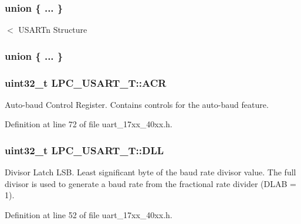 \subsubsection[{\texorpdfstring{"@6}{@6}}]{\setlength{\rightskip}{0pt plus 5cm}union \{ ... \} }\hypertarget{structLPC__USART__T_add0ae85b6ee1d205dde773d1e1881af6}{}\label{structLPC__USART__T_add0ae85b6ee1d205dde773d1e1881af6}
$<$ U\+S\+A\+R\+Tn Structure \subsubsection[{\texorpdfstring{"@8}{@8}}]{\setlength{\rightskip}{0pt plus 5cm}union \{ ... \} }\hypertarget{structLPC__USART__T_acc78b55e1184fbc55889f95cd70d8105}{}\label{structLPC__USART__T_acc78b55e1184fbc55889f95cd70d8105}
\subsubsection[{\texorpdfstring{A\+CR}{ACR}}]{ uint32\+\_\+t L\+P\+C\+\_\+\+U\+S\+A\+R\+T\+\_\+\+T\+::\+A\+CR}\hypertarget{structLPC__USART__T_a443bb067899c7f269dc903a26522f44b}{}\label{structLPC__USART__T_a443bb067899c7f269dc903a26522f44b}
Auto-\/baud Control Register. Contains controls for the auto-\/baud feature. 

Definition at line 72 of file uart\+\_\+17xx\+\_\+40xx.\+h.

\subsubsection[{\texorpdfstring{D\+LL}{DLL}}]{ uint32\+\_\+t L\+P\+C\+\_\+\+U\+S\+A\+R\+T\+\_\+\+T\+::\+D\+LL}\hypertarget{structLPC__USART__T_ac2e91646e820b1527747154d82778e48}{}\label{structLPC__USART__T_ac2e91646e820b1527747154d82778e48}
Divisor Latch L\+SB. Least significant byte of the baud rate divisor value. The full divisor is used to generate a baud rate from the fractional rate divider (D\+L\+AB = 1). 

Definition at line 52 of file uart\+\_\+17xx\+\_\+40xx.\+h.

